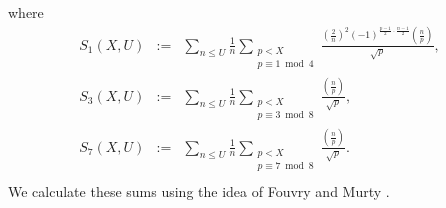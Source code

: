 \documentclass[a4paper, 11pt]{article}
\theoremstyle{plain}
\newcommand{\?}{\textcolor{red}{??}}
\begin{document}
where
\begin{eqnarray*}
    S_1(X,U)&:=& \sum_{n \le U} \frac{1}{n} \sum_{\substack{p<X \\ p \equiv1 \bmod 4}}\frac{\left( \frac{2}{n} \right)^2(-1)^{\frac{p-1}{2} \cdot \frac{n-1}{2}} \left( \frac{n}{p} \right)}{\sqrt{p}},\\
    S_3(X,U)&:=&\sum_{n \le U} \frac{1}{n} \sum_{\substack{p<X \\ p \equiv 3\bmod 8}}\frac{\left( \frac{n}{p} \right)}{\sqrt{p}},\\
    S_7(X,U)&:=&\sum_{n \le U} \frac{1}{n} \sum_{\substack{p<X \\ p \equiv7 \bmod 8}}\frac{\left( \frac{n}{p} \right)}{\sqrt{p}}.\\
\end{eqnarray*}
We calculate these sums using the idea of Fouvry and Murty \cite[Theorem 4]{FM01}.
\end{document}
